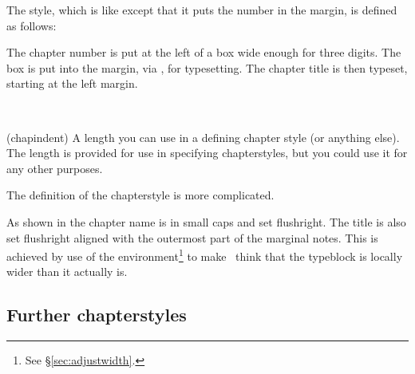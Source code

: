 The  style, which is like  except that it
puts the number in the margin, is defined as follows:
\begin{lcode}
\end{lcode}
The chapter number is put at the left of a box wide enough for three digits.
The box is put into the margin, via \cmd{\llap}, for typesetting. The
chapter title is then typeset, starting at the left margin.

\begin{syntax}
\lnc{\chapindent} \\
\end{syntax}
\glossary(chapindent)%
  {}%
  {A length you can use in a defining chapter style (or anything else).}
The length \lnc{\chapindent} is provided for use in specifying chapterstyles,
but you could use it for any other purposes.

    The definition of the  chapterstyle is more complicated.
\begin{lcode}
\end{lcode}
As shown in  the chapter name is in small caps and set
flushright. The title is also set flushright aligned with the outermost
part of the marginal notes. This is achieved by use of the 
environment\footnote{See \S\ref{sec:adjustwidth}.} to make \ltx\ think
that the typeblock is locally wider than it actually is.

\subsection{Further chapterstyles}



